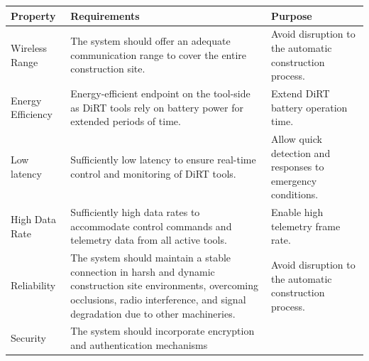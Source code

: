\documentclass[11pt]{book}
\begin{document}
\begin{table}[H]
\begin{adjustbox}{max width=\textwidth}
\begin{tabular}{p{2.33cm}p{8.25cm}p{5.34cm}}
\hline
\multicolumn{1}{|p{2.33cm}}{{\footnotesize \textbf{Property}}} & 
\multicolumn{1}{|p{8.25cm}}{{\footnotesize \textbf{Requirements}}} & 
\multicolumn{1}{|p{5.34cm}|}{{\footnotesize \textbf{Purpose}}} \\ 
\hline
\multicolumn{1}{|p{2.33cm}}{{\footnotesize Wireless Range}} & 
\multicolumn{1}{|p{8.25cm}}{{\footnotesize The system should offer an adequate communication range to cover the entire construction site. }} & 
\multicolumn{1}{|p{5.34cm}|}{{\footnotesize Avoid disruption to the automatic construction process.}} \\ 
\hline
\multicolumn{1}{|p{2.33cm}}{{\footnotesize Energy Efficiency}} & 
\multicolumn{1}{|p{8.25cm}}{{\footnotesize Energy-efficient endpoint on the tool-side as DiRT tools rely on battery power for extended periods of time.\par}} & 
\multicolumn{1}{|p{5.34cm}|}{{\footnotesize Extend DiRT battery operation time.}} \\ 
\hline
\multicolumn{1}{|p{2.33cm}}{{\footnotesize Low latency}} & 
\multicolumn{1}{|p{8.25cm}}{{\footnotesize Sufficiently low latency to ensure real-time control and monitoring of DiRT tools.}} & 
\multicolumn{1}{|p{5.34cm}|}{{\footnotesize Allow quick detection and responses to emergency conditions.}} \\ 
\hline
\multicolumn{1}{|p{2.33cm}}{{\footnotesize High Data Rate}} & 
\multicolumn{1}{|p{8.25cm}}{{\footnotesize Sufficiently high data rates to accommodate control commands and telemetry data from all active tools.\par}} & 
\multicolumn{1}{|p{5.34cm}|}{{\footnotesize Enable high telemetry frame rate.}} \\ 
\hline
\multicolumn{1}{|p{2.33cm}}{{\footnotesize Reliability}} & 
\multicolumn{1}{|p{8.25cm}}{{\footnotesize The system should maintain a stable connection in harsh and dynamic construction site environments, overcoming occlusions, radio interference, and signal degradation due to other machineries.\par}} & 
\multicolumn{1}{|p{5.34cm}|}{{\footnotesize Avoid disruption to the automatic construction process.}} \\ 
\hline
\multicolumn{1}{|p{2.33cm}}{{\footnotesize Security}} & 
\multicolumn{1}{|p{8.25cm}}{{\footnotesize The system should incorporate encryption and authentication mechanisms }} & 

\end{tabular}
\end{adjustbox}
\end{table}
\end{document}
